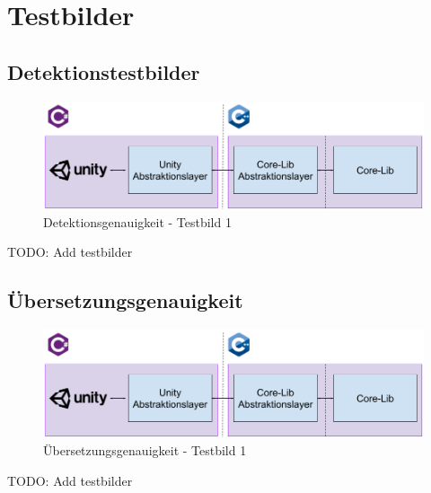 \section{Testbilder}\label{anhang:testbilder}

\subsection{Detektionstestbilder}\label{anhang:detektionsgenauigkeit:testbilder}
\begin{figure}[h!]
    \begin{center}
        \includegraphics[width=0.8\linewidth]{../common/07_appendix/resources/00_detection/00_detektion_testbild_1.png}
    \end{center}
    \caption{Detektionsgenauigkeit - Testbild 1}
    \label{fig:detektionsgenauigkeit:testbild:1}
\end{figure}
TODO: Add testbilder

\subsection{Übersetzungsgenauigkeit}\label{anhang:uebersetzungsgenauigkeit:testbilder}
\begin{figure}[h!]
    \begin{center}
        \includegraphics[width=0.8\linewidth]{../common/07_appendix/resources/01_translation/00_translation_testbild_1.png}
    \end{center}
    \caption{Übersetzungsgenauigkeit - Testbild 1}
    \label{fig:uebersetzungsgenauigkeit:testbild:1}
\end{figure}
TODO: Add testbilder
